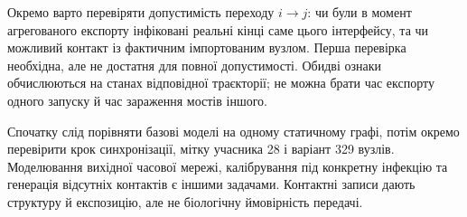\documentclass[11pt,a4paper]{article}
\begin{document}
Окремо варто перевіряти допустимість переходу $i\to j$: чи були в момент агрегованого експорту інфіковані реальні кінці саме цього інтерфейсу, та чи можливий контакт із фактичним імпортованим вузлом. Перша перевірка необхідна, але не достатня для повної допустимості. Обидві ознаки обчислюються на станах відповідної траєкторії; не можна брати час експорту одного запуску й час зараження мостів іншого.

Спочатку слід порівняти базові моделі на одному статичному графі, потім окремо перевірити крок синхронізації, мітку учасника 28 і варіант 329 вузлів. Моделювання вихідної часової мережі, калібрування під конкретну інфекцію та генерація відсутніх контактів є іншими задачами. Контактні записи дають структуру й експозицію, але не біологічну ймовірність передачі.
\end{document}
